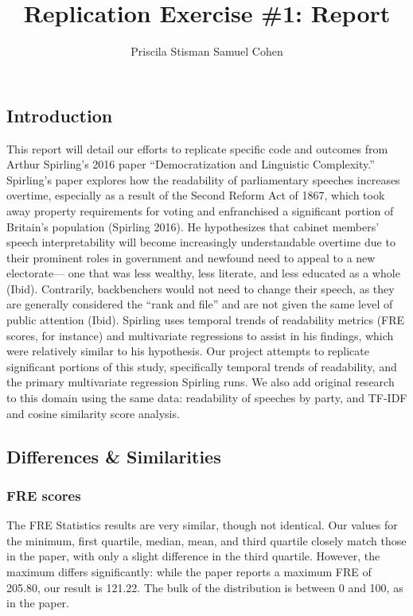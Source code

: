 \documentclass[
  letterpaper,
  DIV=11,
  numbers=noendperiod]{scrartcl}
\title{Replication Exercise \#1: Report}
\author{Priscila Stisman \textbar{} Samuel Cohen}
\date{}
\renewcommand*\contentsname{Table of contents}
\newcommand\contentsname{Table of contents}
\begin{document}
\maketitle

\renewcommand*\contentsname{Table of contents}
{
\hypersetup{linkcolor=}
\setcounter{tocdepth}{3}
\tableofcontents
}

\subsection{Introduction}\label{introduction}

This report will detail our efforts to replicate specific code and
outcomes from Arthur Spirling's 2016 paper ``Democratization and
Linguistic Complexity.'' Spirling's paper explores how the readability
of parliamentary speeches increases overtime, especially as a result of
the Second Reform Act of 1867, which took away property requirements for
voting and enfranchised a significant portion of Britain's population
(Spirling 2016). He hypothesizes that cabinet members' speech
interpretability will become increasingly understandable overtime due to
their prominent roles in government and newfound need to appeal to a new
electorate--- one that was less wealthy, less literate, and less
educated as a whole (Ibid). Contrarily, backbenchers would not need to
change their speech, as they are generally considered the ``rank and
file'' and are not given the same level of public attention (Ibid).
Spirling uses temporal trends of readability metrics (FRE scores, for
instance) and multivariate regressions to assist in his findings, which
were relatively similar to his hypothesis. Our project attempts to
replicate significant portions of this study, specifically temporal
trends of readability, and the primary multivariate regression Spirling
runs. We also add original research to this domain using the same data:
readability of speeches by party, and TF-IDF and cosine similarity score
analysis.

\subsection{Differences \& Similarities}\label{differences-similarities}

\subsubsection{FRE scores}\label{fre-scores}

The FRE Statistics results are very similar, though not identical. Our
values for the minimum, first quartile, median, mean, and third quartile
closely match those in the paper, with only a slight difference in the
third quartile. However, the maximum differs significantly: while the
paper reports a maximum FRE of 205.80, our result is 121.22. The bulk of
the distribution is between 0 and 100, as in the paper.
\end{document}
